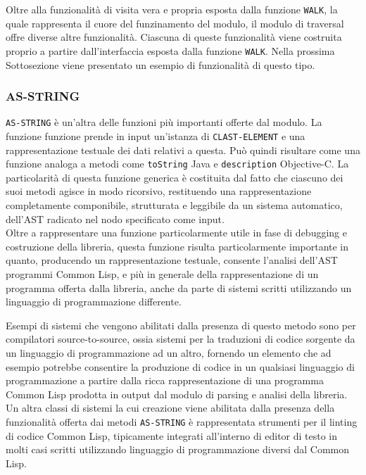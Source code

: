 Oltre alla funzionalità di visita vera e propria esposta dalla funzione
\texttt{WALK}, la quale rappresenta il cuore del funzinamento del modulo, il
modulo di traversal offre diverse altre funzionalità. Ciascuna di queste
funzionalità viene costruita proprio a partire dall'interfaccia esposta dalla
funzione \texttt{WALK}. Nella prossima Sottosezione viene presentato un esempio
di funzionalità di questo tipo.

\subsubsection{AS-STRING}

\texttt{AS-STRING} è un'altra delle funzioni più importanti offerte dal modulo.
La funzione funzione prende in input un'istanza di \texttt{CLAST-ELEMENT} e una
rappresentazione testuale dei dati relativi a questa. Può quindi risultare come
una funzione analoga a metodi come \texttt{toString} Java e \texttt{description}
Objective-C. La particolarità di questa funzione generica è costituita dal fatto
che ciascuno dei suoi metodi agisce in modo ricorsivo, restituendo una
rappresentazione completamente componibile, strutturata e leggibile da un
sistema automatico, dell'AST radicato nel nodo specificato come input.\\

Oltre a rappresentare una funzione particolarmente utile in fase di debugging e
costruzione della libreria, questa funzione risulta particolarmente importante
in quanto, producendo un rappresentazione testuale, consente l'analisi dell'AST
programmi Common Lisp, e più in generale della rappresentazione di un programma offerta dalla libreria, anche da parte di sistemi scritti utilizzando un
linguaggio di programmazione differente.

Esempi di sistemi che vengono abilitati dalla presenza di questo metodo sono per
compilatori source-to-source, ossia sistemi per la traduzioni di codice sorgente
da un linguaggio di programmazione ad un altro, fornendo un elemento che ad
esempio potrebbe consentire la produzione di codice in un qualsiasi linguaggio
di programmazione a partire dalla ricca rappresentazione di una programma Common
Lisp prodotta in output dal modulo di parsing e analisi della libreria. Un altra
classi di sistemi la cui creazione viene abilitata dalla presenza della
funzionalità offerta dai metodi \texttt{AS-STRING} è rappresentata strumenti per
il linting di codice Common Lisp, tipicamente integrati all'interno di editor di
testo in molti casi scritti utilizzando linguaggio di programmazione diversi dal
Common Lisp.
